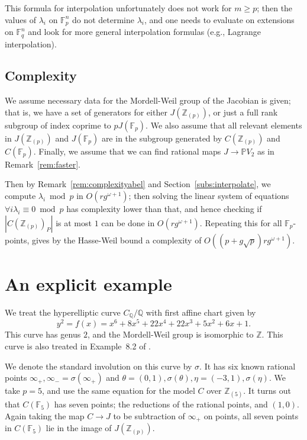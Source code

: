 \documentclass[12pt]{article}
\newcommand{\Z}{\mathbb{Z}}
\newcommand{\Q}{\mathbb{Q}}
\renewcommand{\P}{\mathbb{P}}
\newcommand{\F}{\mathbb{F}}
\theoremstyle{plain}
\theoremstyle{definition}
\theoremstyle{remark}
\begin{document}
This formula for interpolation unfortunately does not work for $m \geq p$; then the values of $\lambda_i$ on $\F_p^{n}$ do not determine $\lambda_i$, and one needs to evaluate on extensions on $\F_q^n$ and look for more general interpolation formulas (e.g., Lagrange interpolation).

\subsection{Complexity}
We assume necessary data for the Mordell-Weil group of the Jacobian is given; that is, we have a set of generators for either $J(\Z_{(p)})$, or just a full rank subgroup of index coprime to $pJ(\F_p)$. We also assume that all relevant elements in $J(\Z_{(p)})$ and $J(\F_p)$ are in the subgroup generated by $C(\Z_{(p)})$ and $C(\F_p)$. Finally, we assume that we can find rational maps $J \to \P V_2$ as in Remark~\ref{rem:faster}.

Then by Remark~\ref{rem:complexityabel} and Section~\ref{subs:interpolate}, we compute $\lambda_i \bmod p$ in $O(rg^{\omega+1})$; then solving the linear system of equations $\forall i \lambda_i \equiv 0 \bmod p$ has complexity lower than that, and hence checking if $|C(\Z_{(p)})_P|$ is at most $1$ can be done in $O(rg^{\omega+1})$. Repeating this for all $\F_p$-points, gives by the Hasse-Weil bound a complexity of $O\left((p + g\sqrt{p})rg^{\omega+1}\right)$.

\section{An explicit example}
\label{section:example}
We treat the hyperelliptic curve $C_\Q/\Q$ with first affine chart given by
\[
y^2 = f(x) = x^6+ 8x^5+ 22x^4+ 22x^3+ 5x^2+ 6x+ 1.
\]
This curve has genus $2$, and the Mordell-Weil group is isomorphic to $\Z$. This curve is also treated in Example~8.2 of \cite{poonen12}.

We denote the standard involution on this curve by $\sigma$. It has six known rational points $\infty_+,\infty_- = \sigma(\infty_+)$ and $\theta = (0,1),\sigma(\theta),\eta=(-3,1),\sigma(\eta)$. We take $p = 5$, and use the same equation for the model $C$ over $\Z_{(5)}$. It turns out that $C(\F_5)$ has seven points; the reductions of the rational points, and $(1,0)$. Again taking the map $C \to J$ to be subtraction of $\infty_+$ on points, all seven points in $C(\F_5)$ lie in the image of $J(\Z_{(p)})$.
\end{document}
